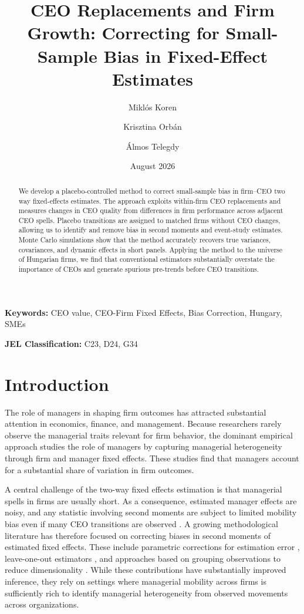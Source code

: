 \documentclass[sigconf,nonacm]{acmart}
\title{CEO Replacements and Firm Growth: Correcting for Small-Sample Bias in Fixed-Effect Estimates}
\author{Miklós Koren}
\affiliation{\institution{Central European University, ELTE Centre for Economic and Regional Studies, CEPR and CESifo}}
\author{Krisztina Orbán}
\affiliation{\institution{Monash University}}
\author{Álmos Telegdy}
\affiliation{\institution{Corvinus University of Budapest}}
\date{August 2026}
\begin{document}
\begin{abstract}
\noindent We develop a placebo-controlled method to correct small-sample bias in firm–CEO two way fixed-effects estimates. The approach exploits within-firm CEO replacements and measures changes in CEO quality from differences in firm performance across adjacent CEO spells. Placebo transitions are assigned to matched firms without CEO changes, allowing us to identify and remove bias in second moments and event-study estimates. Monte Carlo simulations show that the method accurately recovers true variances, covariances, and dynamic effects in short panels. Applying the method to the universe of Hungarian firms, we find that conventional estimators substantially overstate the importance of CEOs and generate spurious pre-trends before CEO transitions.
\end{abstract}

\maketitle

\textbf{Keywords:} CEO value, CEO-Firm Fixed Effects, Bias Correction, Hungary, SMEs

\textbf{JEL Classification:} C23, D24, G34


\section{Introduction}

The role of managers in shaping firm outcomes has attracted substantial attention in economics, finance, and management. Because researchers rarely observe the managerial traits relevant for firm behavior, the dominant empirical approach studies the role of managers by capturing managerial heterogeneity through firm and manager fixed effects. These studies find that managers account for a substantial share of variation in firm outcomes.

A central challenge of the two-way fixed effects estimation is that managerial spells in firms are usually short. As a consequence, estimated manager effects are noisy, and any statistic involving second moments are subject to limited mobility bias even if many CEO transitions are observed \citep{kline2024firm}. A growing methodological literature has therefore focused on correcting biases in second moments of estimated fixed effects. These include parametric corrections for estimation error \citep{andrews2008high, gaure2014correlation}, leave-one-out estimators \citep{kline2020leave}, and approaches based on grouping observations to reduce dimensionality \citep{Bonhomme2019-xi,bonhomme2023much}. While these contributions have substantially improved inference, they rely on settings where managerial mobility across firms is sufficiently rich to identify managerial heterogeneity from observed movements across organizations.
\end{document}
